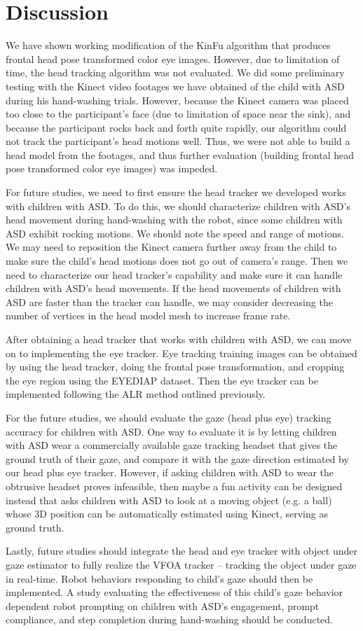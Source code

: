 \section{Discussion}
We have shown working modification of the KinFu algorithm that produces frontal head pose transformed color eye images.  However, due to limitation of time, the head tracking algorithm was not evaluated.  We did some preliminary testing with the Kinect video footages we have obtained of the child with ASD during his hand-washing trials.  However, because the Kinect camera was placed too close to the participant's face (due to limitation of space near the sink), and because the participant rocks back and forth quite rapidly, our algorithm could not track the participant's head motions well.  Thus, we were not able to build a head model from the footages, and thus further evaluation (building frontal head pose transformed color eye images) was impeded.

For future studies, we need to first ensure the head tracker we developed works with children with ASD.  To do this, we should characterize children with ASD's head movement during hand-washing with the robot, since some children with ASD exhibit rocking motions.  We should note the speed and range of motions.  We may need to reposition the Kinect camera further away from the child to make sure the child's head motions does not go out of camera's range.  Then we need to characterize our head tracker's capability and make sure it can handle children with ASD's head movements.  If the head movements of children with ASD are faster than the tracker can handle, we may consider decreasing the number of vertices in the head model mesh to increase frame rate.

After obtaining a head tracker that works with children with ASD, we can move on to implementing the eye tracker.  Eye tracking training images can be obtained by using the head tracker, doing the frontal pose transformation, and cropping the eye region using the EYEDIAP dataset.  Then the eye tracker can be implemented following the ALR method outlined previously.

For the future studies, we should evaluate the gaze (head plus eye) tracking accuracy for children with ASD.  One way to evaluate it is by letting children with ASD wear a commercially available gaze tracking headset that gives the ground truth of their gaze, and compare it with the gaze direction estimated by our head plus eye tracker.  However, if asking children with ASD to wear the obtrusive headset proves infeasible, then maybe a fun activity can be designed instead that asks children with ASD to look at a moving object (e.g. a ball) whose 3D position can be automatically estimated using Kinect, serving as ground truth.

Lastly, future studies should integrate the head and eye tracker with object under gaze estimator to fully realize the VFOA tracker -- tracking the object under gaze in real-time.  Robot behaviors responding to child's gaze should then be implemented.  A study evaluating the effectiveness of this child's gaze behavior dependent robot prompting on children with ASD's engagement, prompt compliance, and step completion during hand-washing should be conducted.